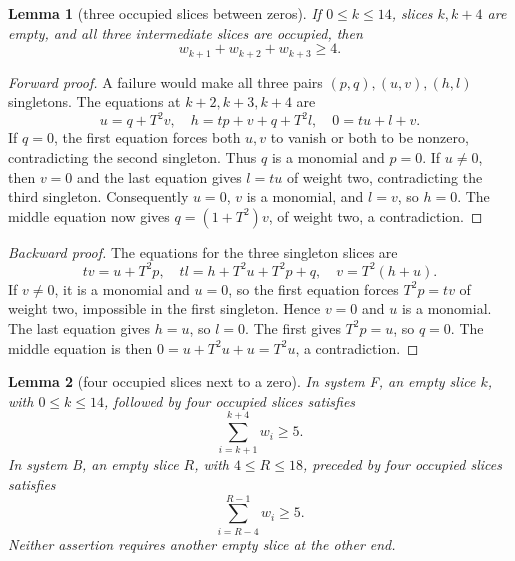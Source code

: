 \documentclass{article}
\newtheorem{lemma}{Lemma}
\begin{document}
\begin{lemma}[three occupied slices between zeros]\label{lem:three}
  If \(0\le k\le 14\), slices \(k,k+4\) are empty, and all three intermediate
  slices are occupied, then
  \begin{equation}
    w_{k+1}+w_{k+2}+w_{k+3}\ge 4.
  \end{equation}
\end{lemma}

\begin{proof}[Forward proof]
%
  A failure would make all three pairs \((p,q),(u,v),(h,l)\)
  singletons. The equations at \(k+2,k+3,k+4\) are
  \begin{equation}
    u=q+T^2v, \quad h=tp+v+q+T^2l, \quad 0=tu+l+v.
  \end{equation}
  If \(q=0\), the first equation forces both \(u,v\) to vanish or both to be
  nonzero, contradicting the second singleton. Thus \(q\) is a monomial and
  \(p=0\). If \(u\ne 0\), then \(v=0\) and the last equation gives \(l=tu\) of
  weight two, contradicting the third singleton. Consequently \(u=0\), \(v\)
  is a monomial, and \(l=v\), so \(h=0\). The middle equation now gives
  \(q=(1+T^2)v\), of weight two, a contradiction.
\end{proof}

\begin{proof}[Backward proof]
  The equations for the three singleton slices are
  \begin{equation}
    tv=u+T^2p, \quad tl=h+T^2u+T^2p+q, \quad v=T^2(h+u).
  \end{equation}
  If \(v\ne 0\), it is a monomial and \(u=0\), so the first equation forces
  \(T^2p=tv\) of weight two, impossible in the first singleton. Hence \(v=0\)
  and \(u\) is a monomial. The last equation gives \(h=u\), so \(l=0\). The first
  gives \(T^2p=u\), so \(q=0\). The middle equation is then
  \(0=u+T^2u+u=T^2u\), a contradiction.
\end{proof}

\begin{lemma}[four occupied slices next to a zero]\label{lem:four}
  In system F, an empty slice \(k\), with \(0\le k\le 14\), followed by four
  occupied slices satisfies
  \begin{equation}
    \sum_{i=k+1}^{k+4}w_i\ge 5.
  \end{equation}
  In system B, an empty slice \(R\), with \(4\le R\le 18\), preceded by four
  occupied slices satisfies
  \begin{equation}
    \sum_{i=R-4}^{R-1}w_i\ge 5.
  \end{equation}
  Neither assertion requires another empty slice at the other end.
\end{lemma}
\end{document}
